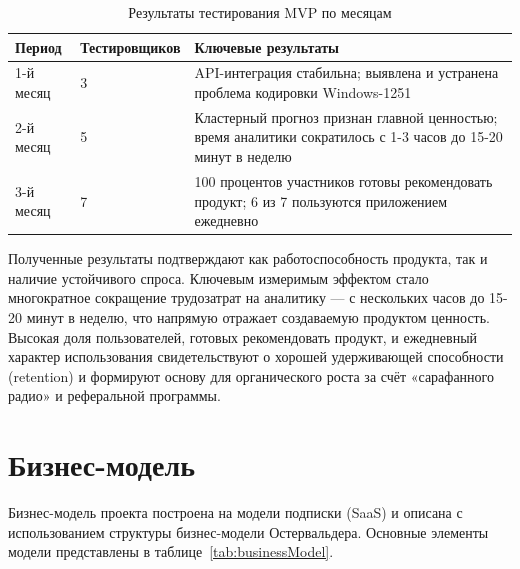 \begin{table}[H]
\caption{Результаты тестирования MVP по месяцам}
\label{tab:testResults}
\begin{small}
\begin{center}
\vspace{-0.5cm}\begin{tabular}{|p{1.5cm}|p{3cm}|p{10.5cm}|}
\hline
Период & Тестировщиков & Ключевые результаты \\ \hline
1-й месяц & 3 & API-интеграция стабильна; выявлена и устранена проблема кодировки Windows-1251 \\ \hline
2-й месяц & 5 & Кластерный прогноз признан главной ценностью; время аналитики сократилось с 1-3 часов до 15-20 минут в неделю \\ \hline
3-й месяц & 7 & 100 процентов участников готовы рекомендовать продукт; 6 из 7 пользуются приложением ежедневно \\ \hline
\end{tabular}
\end{center}
\end{small}
\end{table}

Полученные результаты подтверждают как работоспособность продукта, так и наличие устойчивого спроса. Ключевым измеримым эффектом стало многократное сокращение трудозатрат на аналитику --- с нескольких часов до 15-20 минут в неделю, что напрямую отражает создаваемую продуктом ценность. Высокая доля пользователей, готовых рекомендовать продукт, и ежедневный характер использования свидетельствуют о хорошей удерживающей способности (retention) и формируют основу для органического роста за счёт «сарафанного радио» и реферальной программы.

\section{Бизнес-модель}

Бизнес-модель проекта построена на модели подписки (SaaS) и описана с использованием структуры бизнес-модели Остервальдера. Основные элементы модели представлены в таблице~\ref{tab:businessModel}.

